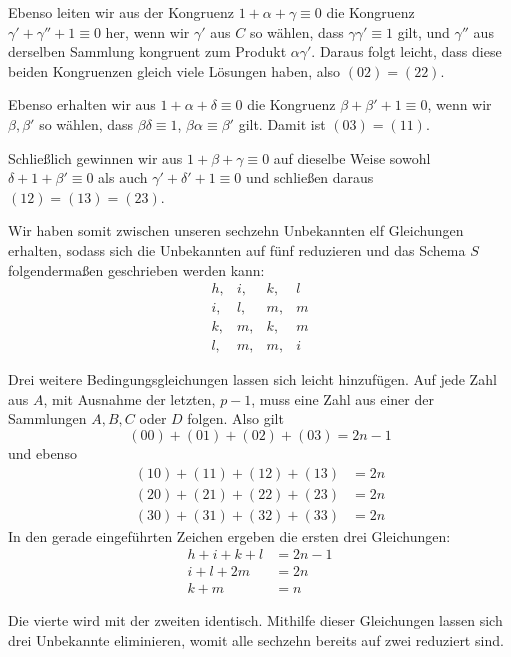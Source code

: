 Ebenso leiten wir aus der Kongruenz $1+\alpha+\gamma\equiv0$ die Kongruenz $\gamma'+\gamma''+1\equiv0$ her, wenn wir $\gamma'$ aus $C$ so wählen, dass $\gamma\gamma'\equiv1$ gilt, und $\gamma''$ aus derselben Sammlung kongruent zum Produkt $\alpha\gamma'$. Daraus folgt leicht, dass diese beiden Kongruenzen gleich viele Lösungen haben, also $(02)=(22)$.

Ebenso erhalten wir aus $1+\alpha+\delta\equiv0$ die Kongruenz $\beta+\beta'+1\equiv0$, wenn wir $\beta,\beta'$ so wählen, dass $\beta\delta\equiv1$, $\beta\alpha\equiv\beta'$ gilt. Damit ist $(03)=(11)$.

Schließlich gewinnen wir aus $1+\beta+\gamma\equiv0$ auf dieselbe Weise sowohl $\delta+1+\beta'\equiv0$ als auch $\gamma'+\delta'+1\equiv0$ und schließen daraus $(12)=(13)=(23)$.

Wir haben somit zwischen unseren sechzehn Unbekannten elf Gleichungen erhalten, sodass sich die Unbekannten auf fünf reduzieren und das Schema $S$ folgendermaßen geschrieben werden kann:
\[
\begin{array}{llll}
h,&i,&k,&l\\
i,&l,&m,&m\\
k,&m,&k,&m\\
l,&m,&m,&i
\end{array}
\]

Drei weitere Bedingungsgleichungen lassen sich leicht hinzufügen. Auf jede Zahl aus $A$, mit Ausnahme der letzten, $p-1$, muss eine Zahl aus einer der Sammlungen $A,B,C$ oder $D$ folgen. Also gilt
\[
(00)+(01)+(02)+(03)=2n-1
\]
und ebenso
\[
\begin{aligned}
(10)+(11)+(12)+(13)&=2n\\
(20)+(21)+(22)+(23)&=2n\\
(30)+(31)+(32)+(33)&=2n
\end{aligned}
\]
In den gerade eingeführten Zeichen ergeben die ersten drei Gleichungen:
\[
\begin{aligned}
h+i+k+l&=2n-1\\
i+l+2m&=2n\\
k+m&=n
\end{aligned}
\]

%
Die vierte wird mit der zweiten identisch. Mithilfe dieser Gleichungen lassen sich drei Unbekannte eliminieren, womit alle sechzehn bereits auf zwei reduziert sind.


